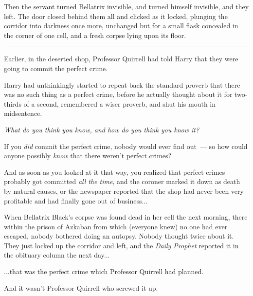 Then the servant turned Bellatrix invisible, and turned himself invisible, and they left. The door closed behind them all and clicked as it locked, plunging the corridor into darkness once more, unchanged but for a small flask concealed in the corner of one cell, and a fresh corpse lying upon its floor.

\begin{center}\rule{3in}{0.4pt}\end{center}

Earlier, in the deserted shop, Professor Quirrell had told Harry that they were going to commit the perfect crime.

Harry had unthinkingly started to repeat back the standard proverb that there was no such thing as a perfect crime, before he actually thought about it for two-thirds of a second, remembered a wiser proverb, and shut his mouth in midsentence.

\emph{What do you think you know, and how do you think you know it?}

If you \emph{did} commit the perfect crime, nobody would ever find out~--- so how could anyone possibly \emph{know} that there weren't perfect crimes?

And as soon as you looked at it that way, you realized that perfect crimes probably got committed \emph{all the time}, and the coroner marked it down as death by natural causes, or the newspaper reported that the shop had never been very profitable and had finally gone out of business...

When Bellatrix Black's corpse was found dead in her cell the next morning, there within the prison of Azkaban from which (everyone knew) no one had ever escaped, nobody bothered doing an autopsy. Nobody thought twice about it. They just locked up the corridor and left, and the \emph{Daily Prophet} reported it in the obituary column the next day...

...that was the perfect crime which Professor Quirrell had planned.

And it wasn't Professor Quirrell who screwed it up.
